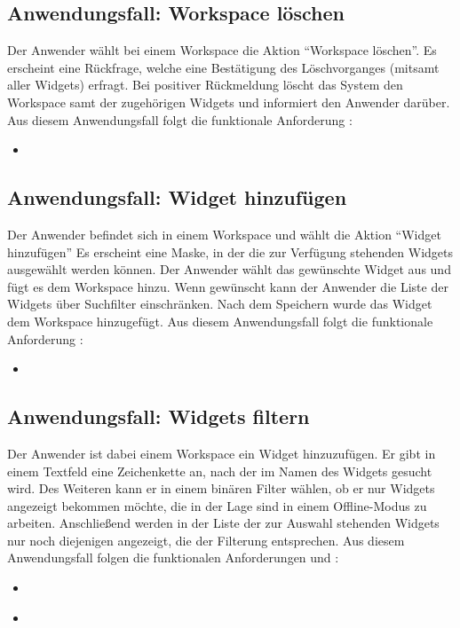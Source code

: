 \subsection{Anwendungsfall: Workspace löschen}
Der Anwender wählt bei einem Workspace die Aktion "`Workspace löschen"'. Es erscheint eine Rückfrage, welche eine Bestätigung des Löschvorganges (mitsamt aller Widgets) erfragt. Bei positiver Rückmeldung löscht das System den Workspace samt der zugehörigen Widgets und informiert den Anwender darüber. Aus diesem Anwendungsfall folgt die funktionale Anforderung :
\begin{itemize}
 \item \requirementf{\requirementWorkspaceDelete}\label{requirementWorkspaceDelete}
\end{itemize}

\subsection{Anwendungsfall: Widget hinzufügen}
Der Anwender befindet sich in einem Workspace und wählt die Aktion "`Widget hinzufügen"' Es erscheint eine Maske, in der die zur Verfügung stehenden Widgets ausgewählt werden können. Der Anwender wählt das gewünschte Widget aus und fügt es dem Workspace hinzu. Wenn gewünscht kann der Anwender die Liste der Widgets über Suchfilter einschränken. Nach dem Speichern wurde das Widget dem Workspace hinzugefügt. Aus diesem Anwendungsfall folgt die funktionale Anforderung :
\begin{itemize}
 \item \requirementf{\requirementWidgetAdd}\label{requirementWidgetAdd}
\end{itemize}

\subsection{Anwendungsfall: Widgets filtern}
Der Anwender ist dabei einem Workspace ein Widget hinzuzufügen. Er gibt in einem Textfeld eine Zeichenkette an, nach der im Namen des Widgets gesucht wird. Des Weiteren kann er in einem binären Filter wählen, ob er nur Widgets angezeigt bekommen möchte, die in der Lage sind in einem Offline-Modus zu arbeiten. Anschließend werden in der Liste der zur Auswahl stehenden Widgets nur noch diejenigen angezeigt, die der Filterung entsprechen. Aus diesem Anwendungsfall folgen die funktionalen Anforderungen  und :
\begin{itemize}
 \item \requirementf{\requirementWidgetFilterName}\label{requirementWidgetFilterName}
 \item \requirementf{\requirementWidgetFilterOnline}\label{requirementWidgetFilterOnline}
\end{itemize}
 
